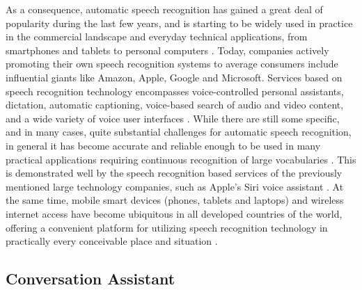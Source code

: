 \documentclass[english, 12pt, a4paper, pdftex, elec, utf8]{aaltothesis}
\begin{document}
As a consequence, automatic speech recognition has gained a great deal of popularity during the last few years, and is starting to be widely used in practice in the commercial landscape and everyday technical applications, from smartphones and tablets to personal computers \cite{yu2014automatic}. Today, companies actively promoting their own speech recognition systems to average consumers include influential giants like Amazon, Apple, Google and Microsoft. Services based on speech recognition technology encompasses voice-controlled personal assistants, dictation, automatic captioning, voice-based search of audio and video content, and a wide variety of voice user interfaces \cite{yu2014automatic, li2014overview}. While there are still some specific, and in many cases, quite substantial challenges for automatic speech recognition, in general it has become accurate and reliable enough to be used in many practical applications requiring continuous recognition of large vocabularies \cite{yu2014automatic, keronen2014approaching, mcgraw2016personalized}. This is demonstrated well by the speech recognition based services of the previously mentioned large technology companies, such as Apple's Siri voice assistant \cite{li2014overview}. At the same time, mobile smart devices (phones, tablets and laptops) and  wireless internet access have become ubiquitous in all developed countries of the world, offering a convenient platform for utilizing speech recognition technology in practically every conceivable place and situation \cite{yu2014automatic, mcgraw2016personalized}.

\subsection{Conversation Assistant}
\end{document}
